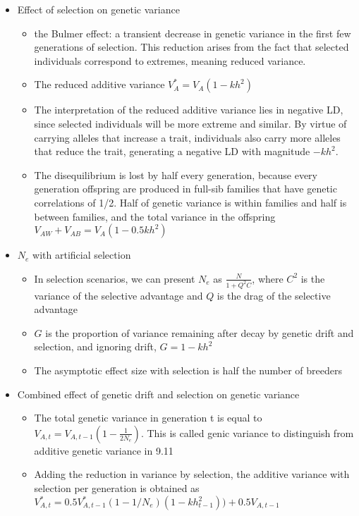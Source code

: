 \documentclass[12pt]{amsart}
\begin{document}
\begin{itemize}
\begin{itemize}
\end{itemize}
\item Effect of selection on genetic variance
\begin{itemize}
\item the Bulmer effect: a transient decrease in genetic variance in the first few generations of selection. This reduction arises from the fact that selected individuals correspond to extremes, meaning reduced variance.
\item The reduced additive variance $V_A^* = V_A(1-kh^2)$
\item The interpretation of the reduced additive variance lies in negative LD, since selected individuals will be more extreme and similar. By virtue of carrying alleles that increase a trait, individuals also carry more alleles that reduce the trait, generating a negative LD with magnitude $-kh^2$. 
\item The disequilibrium is lost by half every generation, because every generation offspring are produced in full-sib families that have genetic correlations of 1/2. Half of genetic variance is within families and half is between families, and the total variance in the offspring $V_{AW} + V_{AB} = V_A(1-0.5kh^2)$ 
\end{itemize}
\item $N_e$ with artificial selection
\begin{itemize}
\item In selection scenarios, we can present $N_e$ as $\frac{N}{1+Q^2C}$, where $C^2$ is the variance of the selective advantage and $Q$ is the drag of the selective advantage
\item $G$ is the proportion of variance remaining after decay by genetic drift and selection, and ignoring drift, $G = 1-kh^2$
\item The asymptotic effect size with selection is half the number of breeders
\end{itemize}
\item Combined effect of genetic drift and selection on genetic variance
\begin{itemize}
\item The total genetic variance in generation t is equal to $V_{A,t} = V_{A,t-1}(1-\frac{1}{2N_e})$. This is called genic variance to distinguish from additive genetic variance in 9.11
\item Adding the reduction in variance by selection, the additive variance with selection per generation is obtained as $V_{A,t}^* = 0.5 V_{A,t-1}^*(1-1/N_e)(1-kh^2_{t-1})) + 0.5V_{A,t-1}$ 

\end{itemize}
\end{itemize}
\end{document}
